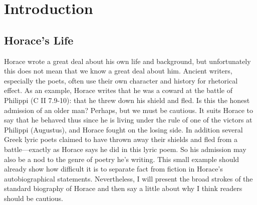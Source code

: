 \chapter*{Introduction}

\section*{Horace's Life}

Horace wrote a great deal about his own life and background, but unfortunately this does not mean that we know a great deal about him.  Ancient writers, especially the poets, often use their own character and history for rhetorical effect.  As an example, Horace writes that he was a coward at the battle of Philippi (C II 7.9-10): that he threw down his shield and fled. Is this the honest admission of an older man? Perhaps, but we must be cautious.  It suits Horace to say that he behaved thus since he is living under the rule of one of the victors at Philippi (Augustus), and Horace fought on the losing side.  In addition several Greek lyric poets claimed to have thrown away their shields and fled from a battle---exactly as Horace says he did in this lyric poem.  So his admission may also be a nod to the genre of poetry he's writing.  This small example should already show how difficult it is to separate fact from fiction in Horace's autobiographical statements.  Nevertheless, I will present the broad strokes of the standard biography of Horace and then say a little about why I think readers should be cautious.


